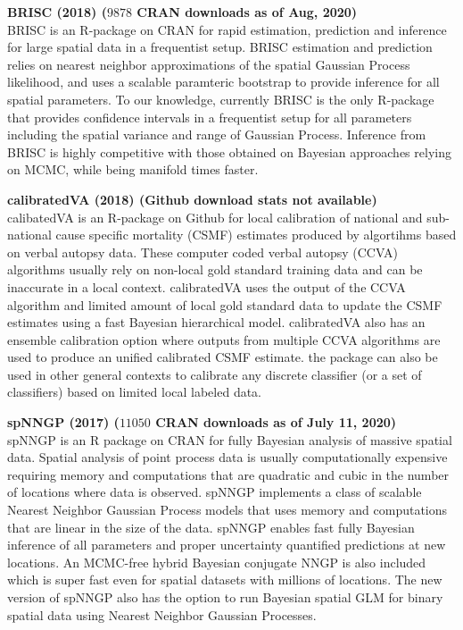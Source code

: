\documentclass[10pt]{article}
\begin{document}
\item
{\bf BRISC (2018) ($9878$ CRAN downloads as of Aug, 2020)} \\
BRISC is an R-package on CRAN for rapid estimation, prediction and inference for large spatial data in a frequentist setup. BRISC estimation and prediction relies on nearest neighbor approximations of the spatial Gaussian Process likelihood, and uses a scalable paramteric bootstrap to provide inference for all spatial parameters. To our knowledge, currently BRISC is the only R-package that provides confidence intervals in a frequentist setup for all parameters including the spatial variance and range of Gaussian Process. Inference from BRISC is highly competitive with those obtained on Bayesian approaches relying on MCMC, while being manifold times faster.
\item
{\bf calibratedVA (2018) (Github download stats not available)}\\ %
calibatedVA is an R-package on Github for local calibration of national and sub-national cause specific mortality (CSMF) estimates produced by algortihms based on verbal autopsy data. These computer coded verbal autopsy (CCVA) algorithms usually rely on non-local gold standard training data and can be inaccurate in a local context. calibratedVA uses the output of the CCVA algorithm and limited amount of local gold standard data to update the CSMF estimates using a fast Bayesian hierarchical model. calibratedVA also has an ensemble calibration option where outputs from multiple CCVA algorithms are used to produce an unified calibrated CSMF estimate. the package can also be used in other general contexts to calibrate any discrete classifier (or a set of classifiers) based on limited local labeled data.
\item 
{\bf spNNGP (2017) ($11050$ CRAN downloads as of July 11, 2020)} \\%
spNNGP is an R package on CRAN for fully Bayesian analysis of massive spatial data. Spatial analysis of point process data is usually computationally expensive requiring memory and computations that are quadratic and cubic in the number of locations where data is observed. spNNGP implements a class of scalable Nearest Neighbor Gaussian Process models that uses memory and computations that are linear in the size of the data. spNNGP enables fast fully Bayesian inference of all parameters and proper uncertainty quantified predictions at new locations. An MCMC-free hybrid Bayesian conjugate NNGP is also included which is super fast even for spatial datasets with millions of locations. The new version of spNNGP also has the option to run Bayesian spatial GLM for binary spatial data using Nearest Neighbor Gaussian Processes. 
\end{document}
